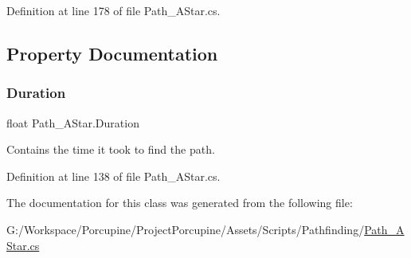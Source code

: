Definition at line 178 of file Path\+\_\+\+A\+Star.\+cs.



\subsection{Property Documentation}
\mbox{\label{class_path___a_star_ac9c17d07d47d2ef16c9dd50bf710e74a}} 
\subsubsection{\texorpdfstring{Duration}{Duration}}
{\footnotesize\ttfamily float Path\+\_\+\+A\+Star.\+Duration\hspace{0.3cm}{\ttfamily [get]}}



Contains the time it took to find the path. 



Definition at line 138 of file Path\+\_\+\+A\+Star.\+cs.



The documentation for this class was generated from the following file\+:\begin{DoxyCompactItemize}
\item 
G\+:/\+Workspace/\+Porcupine/\+Project\+Porcupine/\+Assets/\+Scripts/\+Pathfinding/\hyperlink{_path___a_star_8cs}{Path\+\_\+\+A\+Star.\+cs}\end{DoxyCompactItemize}
